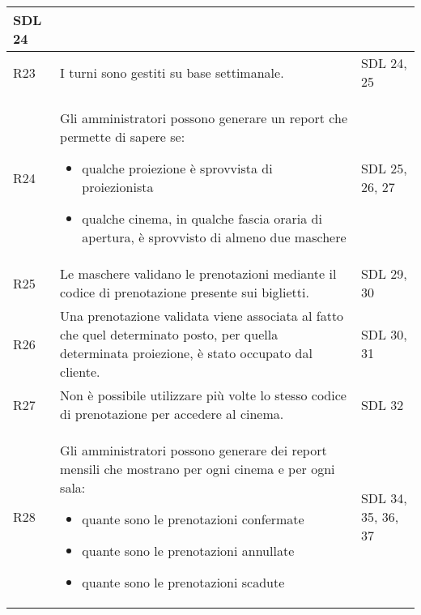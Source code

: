 \begin{longtable}{|p{0.8cm}|p{13.4cm}|p{2.1cm}|}
      SDL 24
      \\\hline
      R23                                                                     &
      I turni sono gestiti su base settimanale.                               &
      SDL 24, 25
      \\\hline
      R24                                                                     &
      Gli amministratori possono generare un report che permette di sapere se:
      \begin{itemize}
            \item qualche proiezione è sprovvista di proiezionista
            \item qualche cinema, in qualche fascia oraria di apertura,
                  è sprovvisto di almeno due maschere
      \end{itemize}             &
      SDL 25, 26, 27
      \\\hline
      R25                                                                     &
      Le maschere validano le prenotazioni mediante il codice di prenotazione
      presente sui biglietti.                                                 &
      SDL 29, 30
      \\\hline
      R26                                                                     &
      Una prenotazione validata viene associata al fatto che quel determinato
      posto, per quella determinata proiezione, è stato occupato dal cliente. &
      SDL 30, 31
      \\\hline
      R27                                                                     &
      Non è possibile utilizzare più volte lo stesso codice di prenotazione
      per accedere al cinema.                                                 &
      SDL 32
      \\\hline
      R28                                                                     &
      Gli amministratori possono generare dei report mensili che mostrano
      per ogni cinema e per ogni sala:
      \begin{itemize}
            \item quante sono le prenotazioni confermate
            \item quante sono le prenotazioni annullate
            \item quante sono le prenotazioni scadute
      \end{itemize}                            &
      SDL 34, 35, 36, 37
      \\\hline
\end{longtable}

